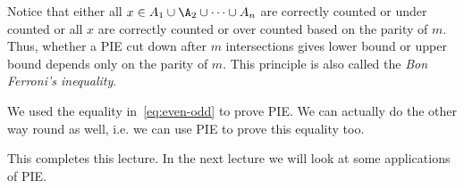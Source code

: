 Notice that either all $x\in A_1\cup\A_2\cup\cdots\cup A_n$ are correctly counted or under counted or all $x$ are correctly counted or over counted based on the parity of $m$. Thus, whether a PIE cut down after $m$ intersections gives lower bound or upper bound depends only on the parity of $m$. This principle is also called the \emph{Bon Ferroni's inequality}.

\begin{remark} 
We used the equality in~\eqref{eq:even-odd} to prove PIE. We can actually do the other way round as well, i.e. we can use PIE to prove this equality too.
\end{remark}

This completes this lecture. In the next lecture we will look at some applications of PIE.


